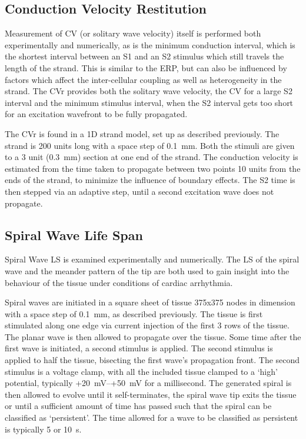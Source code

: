 \subsection{Conduction Velocity Restitution}

Measurement of CV (or solitary wave velocity) itself is performed both
experimentally and numerically, as is the minimum conduction interval, which is
the shortest interval between an S1 and an S2 stimulus which still travels the
length of the strand.  This is similar to the ERP, but can also be influenced by
factors which affect the inter-cellular coupling as well as heterogeneity in the
strand.  The CVr provides both the solitary wave velocity, the CV for a large S2
interval and the minimum stimulus interval, when the S2 interval gets too short
for an excitation wavefront to be fully propagated.

The CVr is found in a 1D strand model, set up as described previously.  The
strand is 200 units long with a space step of 0.1~mm.  Both the stimuli are
given to a 3 unit (0.3~mm) section at one end of the strand.  The conduction
velocity is estimated from the time taken to propagate between two points 10
units from the ends of the strand, to minimize the influence of boundary
effects.  The S2 time is then stepped via an adaptive step, until a second
excitation wave does not propagate.

\subsection{Spiral Wave Life Span}

Spiral Wave LS is examined experimentally and numerically.  The LS of the spiral
wave and the meander pattern of the tip are both used to gain insight into the
behaviour of the tissue under conditions of cardiac arrhythmia.

Spiral waves are initiated in a square sheet of tissue 375x375 nodes in
dimension with a space step of 0.1~mm, as described previously.  The tissue is
first stimulated along one edge via current injection of the first 3 rows of the
tissue.  The planar wave is then allowed to propagate over the tissue.  Some
time after the first wave is initiated, a second stimulus is applied.  The
second stimulus is applied to half the tissue, bisecting the first wave's
propagation front.  The second stimulus is a voltage clamp, with all the
included tissue clamped to a `high' potential, typically +20~mV--+50~mV for a
millisecond.  The generated spiral is then allowed to evolve until it
self-terminates, the spiral wave tip exits the tissue or until a sufficient
amount of time has passed such that the spiral can be classified as
`persistent'.  The time allowed for a wave to be classified as persistent is
typically 5 or 10~s.

